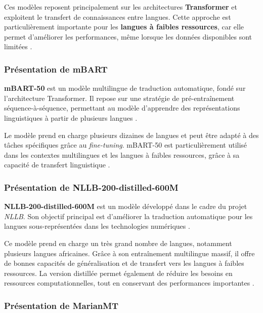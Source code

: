 Ces modèles reposent principalement sur les architectures \textbf{Transformer} et exploitent le transfert de connaissances entre langues. Cette approche est particulièrement importante pour les \textbf{langues à faibles ressources}, car elle permet d'améliorer les performances, même lorsque les données disponibles sont limitées \cite{nguyen2017transfer}.

\subsubsection{Présentation de \ac{mBART}}

\textbf{mBART-50} est un modèle multilingue de traduction automatique, fondé sur l'architecture Transformer. Il repose sur une stratégie de pré-entraînement séquence-à-séquence, permettant au modèle d'apprendre des représentations linguistiques à partir de plusieurs langues \cite{kozhirbayev2024enhancing}.

Le modèle prend en charge plusieurs dizaines de langues et peut être adapté à des tâches spécifiques grâce au \textit{fine-tuning}. mBART-50 est particulièrement utilisé dans les contextes multilingues et les langues à faibles ressources, grâce à sa capacité de transfert linguistique \cite{kozhirbayev2024enhancing}.

\subsubsection{Présentation de NLLB-200-distilled-600M}

\textbf{NLLB-200-distilled-600M} est un modèle développé dans le cadre du projet \textit{\ac{NLLB}}. Son objectif principal est d'améliorer la traduction automatique pour les langues sous-représentées dans les technologies numériques \cite{ranathunga2023neural}.

Ce modèle prend en charge un très grand nombre de langues, notamment plusieurs langues africaines. Grâce à son entraînement multilingue massif, il offre de bonnes capacités de généralisation et de transfert vers les langues à faibles ressources. La version distillée permet également de réduire les besoins en ressources computationnelles, tout en conservant des performances importantes \cite{agyei2025dynamic}.

\subsubsection{Présentation de \ac{MarianMT}}

